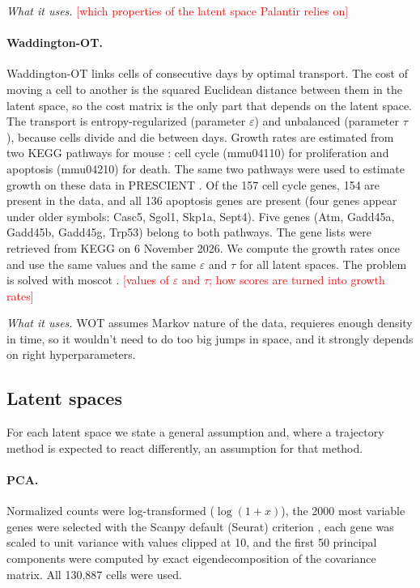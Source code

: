 \documentclass[10pt,a4paper,twocolumn]{article}
\newcommand{\todo}[1]{\textcolor{red}{[#1]}}
\begin{document}
\emph{What it uses.} \todo{which properties of the latent space Palantir relies on}

\paragraph{Waddington-OT.}
Waddington-OT \cite{schiebinger2019optimal} links cells of consecutive days by optimal transport.
The cost of moving a cell to another is the squared Euclidean distance between them in the
latent space, so the cost matrix is the only part that depends on the latent space. The
transport is entropy-regularized (parameter $\varepsilon$) and unbalanced (parameter $\tau$),
because cells divide and die between days. Growth rates are estimated from two KEGG pathways
for mouse \cite{kanehisa2000kegg}: cell cycle (mmu04110) for proliferation and apoptosis
(mmu04210) for death. The same two pathways were used to estimate growth on these data in
PRESCIENT \cite{yeo2021prescient}. Of the 157 cell cycle genes, 154 are present in the data, and
all 136 apoptosis genes are present (four genes appear under older symbols: Casc5, Sgol1, Skp1a,
Sept4). Five genes (Atm, Gadd45a, Gadd45b, Gadd45g, Trp53) belong to both pathways. The gene
lists were retrieved from KEGG on 6 November 2026. We compute the growth rates once and use the same values and the same $\varepsilon$ and
$\tau$ for all latent spaces. The problem is solved with moscot \cite{klein2025moscot}.
\todo{values of $\varepsilon$ and $\tau$; how scores are turned into growth rates}

\emph{What it uses.} 
WOT assumes Markov nature of the data, requieres enough density in time, so it wouldn't need to do too big 
jumps in space, and it strongly depends on right hyperparameters.

\subsection{Latent spaces}
\label{sec:latent}
For each latent space we state a general assumption and, where a trajectory method is expected to
react differently, an assumption for that method.

\paragraph{PCA.}
Normalized counts were log-transformed ($\log(1+x)$), the 2000 most variable genes were
selected with the Scanpy default (Seurat) criterion \cite{wolf2018scanpy}, each gene was scaled
to unit variance with values clipped at 10, and the first 50 principal components were
computed by exact eigendecomposition of the covariance matrix. All 130{,}887 cells were used.
\end{document}
